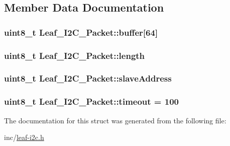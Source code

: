 \subsection{Member Data Documentation}
\hypertarget{structLeaf__I2C__Packet_a78fe04fe85d9b756b9fbe76d07e20b2d}{
\subsubsection[{buffer}]{\setlength{\rightskip}{0pt plus 5cm}uint8\-\_\-t Leaf\-\_\-\-I2\-C\-\_\-\-Packet\-::buffer\mbox{[}64\mbox{]}}}\label{structLeaf__I2C__Packet_a78fe04fe85d9b756b9fbe76d07e20b2d}
\hypertarget{structLeaf__I2C__Packet_a0fb8ef2f47ba136d28858a8c5e3e045c}{
\subsubsection[{length}]{\setlength{\rightskip}{0pt plus 5cm}uint8\-\_\-t Leaf\-\_\-\-I2\-C\-\_\-\-Packet\-::length}}\label{structLeaf__I2C__Packet_a0fb8ef2f47ba136d28858a8c5e3e045c}
\hypertarget{structLeaf__I2C__Packet_abffc930d74df9162efb359f1e56b7c4b}{
\subsubsection[{slave\-Address}]{\setlength{\rightskip}{0pt plus 5cm}uint8\-\_\-t Leaf\-\_\-\-I2\-C\-\_\-\-Packet\-::slave\-Address}}\label{structLeaf__I2C__Packet_abffc930d74df9162efb359f1e56b7c4b}
\hypertarget{structLeaf__I2C__Packet_a0d95e8d6677db64141e9940cb9a0d4a4}{
\subsubsection[{timeout}]{\setlength{\rightskip}{0pt plus 5cm}uint8\-\_\-t Leaf\-\_\-\-I2\-C\-\_\-\-Packet\-::timeout = 100}}\label{structLeaf__I2C__Packet_a0d95e8d6677db64141e9940cb9a0d4a4}


The documentation for this struct was generated from the following file\-:\begin{DoxyCompactItemize}
\item 
inc/\hyperlink{leaf-i2c_8h}{leaf-\/i2c.\-h}\end{DoxyCompactItemize}
